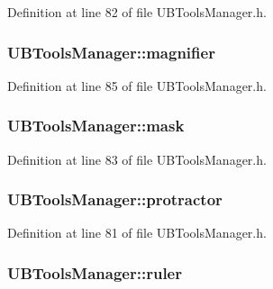 Definition at line 82 of file U\-B\-Tools\-Manager.\-h.

\hypertarget{class_u_b_tools_manager_a471df7ab9140cfa9132d305556a7d7fb}{
\subsubsection[{magnifier}]{ U\-B\-Tools\-Manager\-::magnifier}}\label{df/d8e/class_u_b_tools_manager_a471df7ab9140cfa9132d305556a7d7fb}


Definition at line 85 of file U\-B\-Tools\-Manager.\-h.

\hypertarget{class_u_b_tools_manager_aff695a60e371066eb8d00b005bc97dd5}{
\subsubsection[{mask}]{ U\-B\-Tools\-Manager\-::mask}}\label{df/d8e/class_u_b_tools_manager_aff695a60e371066eb8d00b005bc97dd5}


Definition at line 83 of file U\-B\-Tools\-Manager.\-h.

\hypertarget{class_u_b_tools_manager_ae9a0724a4de13dca8a73ba67e60e2890}{
\subsubsection[{protractor}]{ U\-B\-Tools\-Manager\-::protractor}}\label{df/d8e/class_u_b_tools_manager_ae9a0724a4de13dca8a73ba67e60e2890}


Definition at line 81 of file U\-B\-Tools\-Manager.\-h.

\hypertarget{class_u_b_tools_manager_aec086ff9cf2c9f7ad222c78dd8fab233}{
\subsubsection[{ruler}]{ U\-B\-Tools\-Manager\-::ruler}}\label{df/d8e/class_u_b_tools_manager_aec086ff9cf2c9f7ad222c78dd8fab233}


